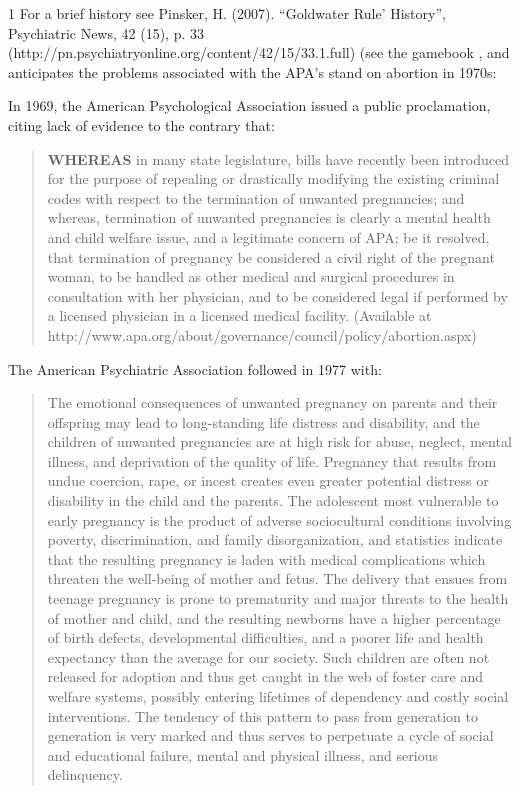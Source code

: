 \begin{refsection}
{1 For a brief history see Pinsker, H. (2007). ``Goldwater Rule' History'', Psychiatric News, 42 (15), p. 33 (http:\slash \slash pn.psychiatryonline.org\slash content\slash 42\slash 15\slash 33.1.full)} (see the gamebook , and anticipates the problems associated with the APA's stand on abortion in 1970s:

In 1969, the American Psychological Association issued a public proclamation, citing lack of evidence to the contrary that:

\begin{quote}

\textbf{WHEREAS} in many state legislature, bills have recently been introduced for the purpose of repealing or drastically modifying the existing criminal codes with respect to the termination of unwanted pregnancies; and whereas, termination of unwanted pregnancies is clearly a mental health and child welfare issue, and a legitimate concern of APA; be it resolved, that termination of pregnancy be considered a civil right of the pregnant woman, to be handled as other medical and surgical procedures in consultation with her physician, and to be considered legal if performed by a licensed physician in a licensed medical facility.⁠ (Available at http:\slash \slash www.apa.org\slash about\slash governance\slash council\slash policy\slash abortion.aspx)
\end{quote}

The American Psychiatric Association followed in 1977 with:

\begin{quote}

The emotional consequences of unwanted pregnancy on parents and their offspring may lead to long-standing life distress and disability, and the children of unwanted pregnancies are at high risk for abuse, neglect, mental illness, and deprivation of the quality of life. Pregnancy that results from undue coercion, rape, or incest creates even greater potential distress or disability in the child and the parents. The adolescent most vulnerable to early pregnancy is the product of adverse sociocultural conditions involving poverty, discrimination, and family disorganization, and statistics indicate that the resulting pregnancy is laden with medical complications which threaten the well-being of mother and fetus. The delivery that ensues from teenage pregnancy is prone to prematurity and major threats to the health of mother and child, and the resulting newborns have a higher percentage of birth defects, developmental difficulties, and a poorer life and health expectancy than the average for our society. Such children are often not released for adoption and thus get caught in the web of foster care and welfare systems, possibly entering lifetimes of dependency and costly social interventions. The tendency of this pattern to pass from generation to generation is very marked and thus serves to perpetuate a cycle of social and educational failure, mental and physical illness, and serious delinquency.


\end{quote}
\end{refsection}

